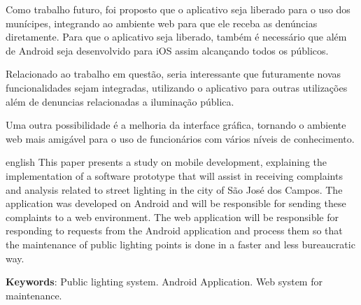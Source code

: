 \documentclass[
	article,			%
	11pt,				%
	oneside,			%
	a4paper,			%
	english,			%
	brazil,				%
	sumario=tradicional
	]{abntex2}
\begin{document}
Como trabalho futuro, foi proposto que o aplicativo seja liberado para o uso
dos munícipes, integrando ao ambiente web para que ele receba as denúncias
diretamente. Para que o aplicativo seja liberado, também é necessário que
além de Android seja desenvolvido para iOS assim alcançando todos os públicos.

Relacionado ao trabalho em questão, seria interessante que futuramente novas
funcionalidades sejam integradas, utilizando o aplicativo para outras
utilizações além de denuncias relacionadas a iluminação pública.

Uma outra possibilidade é a melhoria da interface gráfica, tornando o ambiente
web mais amigável para o uso de funcionários com vários níveis de conhecimento.





\postextual



\emptythanks
\maketitle

\renewcommand{\resumoname}{Abstract}
\begin{resumoumacoluna}
 \begin{otherlanguage*}{english}
   This paper presents a study on mobile development, explaining the
   implementation of a software prototype that will assist in receiving
   complaints and analysis related to street lighting in the city of São José
   dos Campos. The application was developed on Android and will be responsible
   for sending these complaints to a web environment. The web application
   will be responsible for responding to requests from the Android application
   and process them so that the maintenance of public lighting points is done
   in a faster and less bureaucratic way.
   \vspace{\onelineskip}

   \noindent
   \textbf{Keywords}: Public lighting system. Android Application. Web system for maintenance.
 \end{otherlanguage*}
\end{resumoumacoluna}
\end{document}
